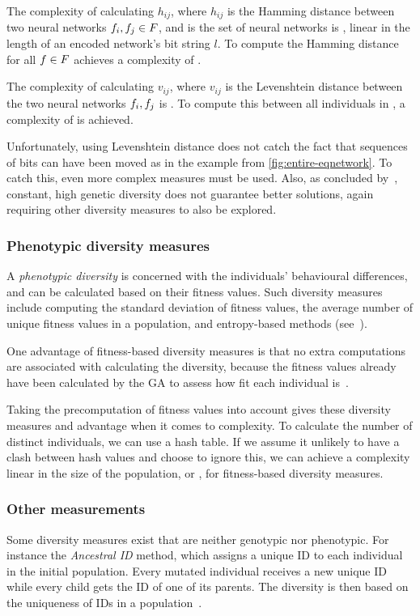 The complexity of calculating $h_{ij}$, where $h_{ij}$ is the Hamming distance between two neural networks $f_i, f_j \in F$, and \indset{} is the set of neural networks is \bigO{\bitstringl}, linear in the length of an encoded network's bit string $l$. To compute the Hamming distance for all $f \in F$ achieves a complexity of \bigO{\indsetl^2 \cdot \bitstringl}. 

The complexity of calculating $v_{ij}$, where $v_{ij}$ is the Levenshtein distance between the two neural networks $f_i, f_j$ is . To compute this between all individuals in \indset{}, a complexity of  is achieved.

Unfortunately, using Levenshtein distance does not catch the fact that sequences of bits can have been moved as in the example from \cref{fig:entire-eqnetwork}. To catch this, even more complex measures must be used. Also, as concluded by~\cite{Darwen00doesextra}, constant, high genetic diversity does not guarantee better solutions, again requiring other diversity measures to also be explored.

\subsubsection{Phenotypic diversity measures}
A \emph{phenotypic diversity} is concerned with the individuals' behavioural differences, and can be calculated based on their fitness values. Such diversity measures include computing the standard deviation of fitness values, the average number of unique fitness values in a population, and entropy-based methods (see~\cite{1250187, 1266373}).

One advantage of fitness-based diversity measures is that no extra computations are associated with calculating the diversity, because the fitness values already have been calculated by the GA to assess how fit each individual is~\cite{Nguyen:2006:ASPGP}.

Taking the precomputation of fitness values into account gives these diversity measures and advantage when it comes to complexity. To calculate the number of distinct individuals, we can use a hash table. If we assume it unlikely to have a clash between hash values and choose to ignore this, we can achieve a complexity linear in the size of the population, or \bigO{\indsetl}, for fitness-based diversity measures.

\subsubsection{Other measurements}
Some diversity measures exist that are neither genotypic nor phenotypic. For instance the \emph{Ancestral ID} method, which assigns a unique ID to each individual in the initial population. Every mutated individual receives a new unique ID while every child gets the ID of one of its parents. The diversity is then based on the uniqueness of IDs in a population~\cite{1250187}.
